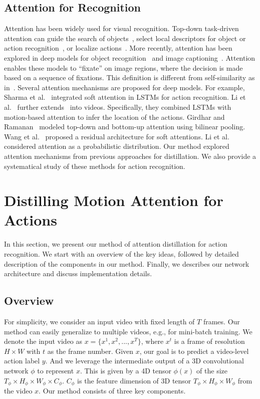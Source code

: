 \documentclass[10pt,twocolumn,letterpaper]{article}
\begin{document}
\subsection{Attention for Recognition}
Attention has been widely used for visual recognition. Top-down task-driven attention can guide the search of objects~\cite{oliva2003top}, select local descriptors for object or action recognition~\cite{gao2009discriminant,mathe}, or localize actions~\cite{gregNIPS}. More recently, attention has been explored in deep models for object recognition~\cite{mnih2014recurrent} and image captioning~\cite{xu2015show}. Attention enables these models to ``fixate'' on image regions, where the decision is made based on a sequence of fixations. This definition is different from self-similarity as in~\cite{vaswani2017attention}. 
Several attention mechanisms are proposed for deep models. For example, Sharma et al.\ \cite{sharma2015action} integrated soft attention in LSTMs for action recognition. Li et al.\ \cite{li2018videolstm} further extends~\cite{xu2015show} into videos. Specifically, they combined LSTMs with motion-based attention to infer the location of the actions. Girdhar and Ramanan~\cite{Girdhar_17b_AttentionalPoolingAction} modeled top-down and bottom-up attention using bilinear pooling. Wang et al.\ \cite{wang2017residual} proposed a residual architecture for soft attentions. Li et al.\ \cite{Li_2018_ECCV} considered attention as a probabilistic distribution. Our method explored attention mechanisms from previous approaches for distillation. We also provide a systematical study of these methods for action recognition. 


\section{Distilling Motion Attention for Actions}
In this section, we present our method of attention distillation for action recognition. We start with an overview of the key ideas, followed by detailed description of the components in our method. Finally, we describes our network architecture and discuss implementation details.

\subsection{Overview}
For simplicity, we consider an input video with fixed length of $T$ frames. Our method can easily generalize to multiple videos, e.g., for mini-batch training. We denote the input video as $x=\{x^1, x^2, ..., x^T\}$, where $x^t$ is a frame of resolution $H\times W$ with $t$ as the frame number. Given $x$, our goal is to predict a video-level action label $y$. And we leverage the intermediate output of a 3D convolutional network $\phi$ to represent $x$. This is given by a 4D tensor $\phi(x)$ of the size $T_\phi \times H_\phi \times W_\phi \times C_\phi$. $C_\phi$ is the feature dimension of 3D tensor $T_\phi \times H_\phi \times W_\phi$ from the video $x$. Our method consists of three key components.
\end{document}
